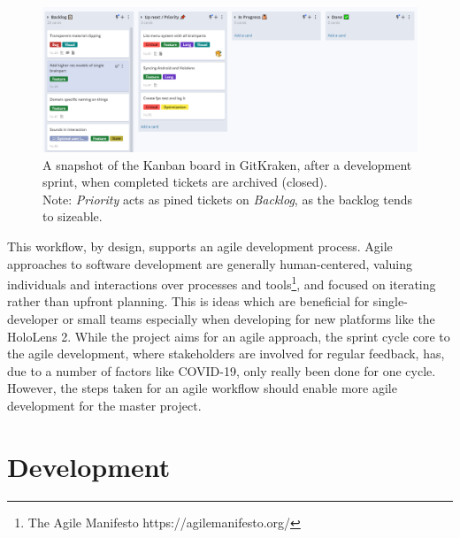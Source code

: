 \begin{figure}[h]
    \includegraphics[width=\textwidth]{fig/kanban2}
    \caption{A snapshot of the Kanban board in GitKraken, after a development sprint, when completed tickets are archived (closed).\\ Note: \textit{Priority} acts as pined tickets on \textit{Backlog}, as the backlog tends to sizeable.}
    \label{fig:kanban}
\end{figure}

This workflow, by design, supports an agile development process. Agile approaches to software development are generally human-centered, valuing individuals and interactions over processes and tools\footnote{The Agile Manifesto https://agilemanifesto.org/}, and focused on iterating rather than upfront planning. This is ideas which are beneficial for single-developer or small teams especially when developing for new platforms like the HoloLens 2. 
While the project aims for an agile approach, the sprint cycle core to the agile development, where stakeholders are involved for regular feedback, has, due to a number of factors like COVID-19, only really been done for one cycle. However, the steps taken for an agile workflow should enable more agile development for the master project.





\section{Development}

